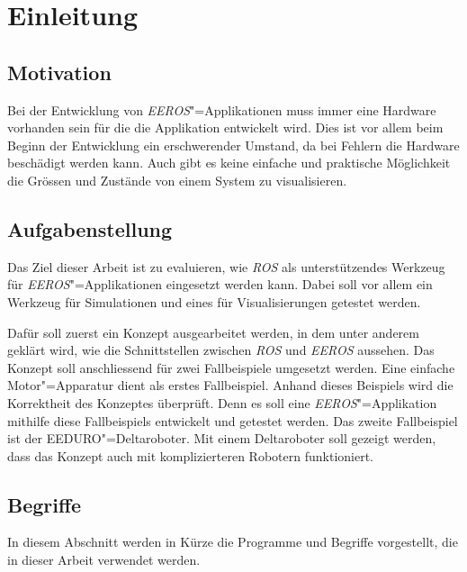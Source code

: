 \chapter{Einleitung}
\section{Motivation}


Bei der Entwicklung von \textit{EEROS}"=Applikationen muss immer eine Hardware vorhanden sein für die die Applikation entwickelt wird.
Dies ist vor allem beim Beginn der Entwicklung ein erschwerender Umstand, da bei Fehlern die Hardware beschädigt werden kann.
Auch gibt es keine einfache und praktische Möglichkeit die Grössen und Zustände von einem System zu visualisieren.


\section{Aufgabenstellung}
Das Ziel dieser Arbeit ist zu evaluieren, wie \textit{ROS} als unterstützendes Werkzeug für \textit{EEROS}"=Applikationen eingesetzt werden kann.
Dabei soll vor allem ein Werkzeug für Simulationen und eines für Visualisierungen getestet werden.

Dafür soll zuerst ein Konzept ausgearbeitet werden, in dem unter anderem geklärt wird, wie die Schnittstellen zwischen \textit{ROS} und \textit{EEROS} aussehen.
Das Konzept soll anschliessend für zwei Fallbeispiele umgesetzt werden.
Eine einfache Motor"=Apparatur dient als erstes Fallbeispiel.
Anhand dieses Beispiels wird die Korrektheit des Konzeptes überprüft.
Denn es soll eine \textit{EEROS}"=Applikation mithilfe diese Fallbeispiels entwickelt und getestet werden.
Das zweite Fallbeispiel ist der EEDURO"=Deltaroboter.
Mit einem Deltaroboter soll gezeigt werden, dass das Konzept auch mit komplizierteren Robotern funktioniert.

\section{Begriffe}
In diesem Abschnitt werden in Kürze die Programme und Begriffe vorgestellt, die in dieser Arbeit verwendet werden.

